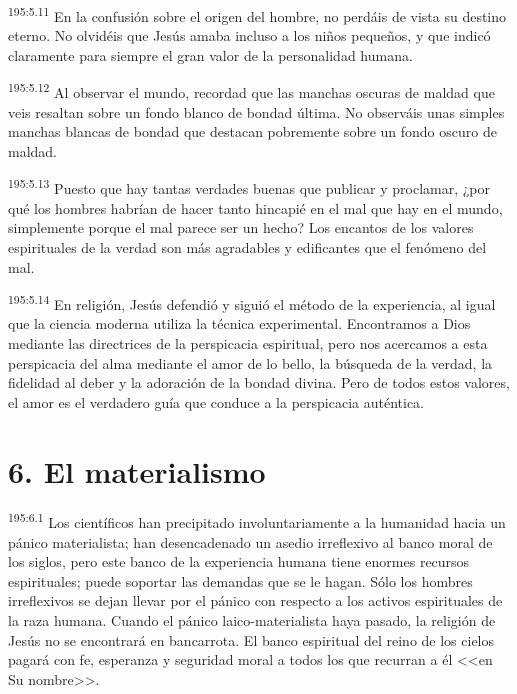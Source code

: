 \par 
\textsuperscript{195:5.11} En la confusión sobre el origen del hombre, no perdáis de vista su destino eterno. No olvidéis que Jesús amaba incluso a los niños pequeños, y que indicó claramente para siempre el gran valor de la personalidad humana.

\par 
\textsuperscript{195:5.12} Al observar el mundo, recordad que las manchas oscuras de maldad que veis resaltan sobre un fondo blanco de bondad última. No observáis unas simples manchas blancas de bondad que destacan pobremente sobre un fondo oscuro de maldad.

\par 
\textsuperscript{195:5.13} Puesto que hay tantas verdades buenas que publicar y proclamar, ¿por qué los hombres habrían de hacer tanto hincapié en el mal que hay en el mundo, simplemente porque el mal parece ser un hecho? Los encantos de los valores espirituales de la verdad son más agradables y edificantes que el fenómeno del mal.

\par 
\textsuperscript{195:5.14} En religión, Jesús defendió y siguió el método de la experiencia, al igual que la ciencia moderna utiliza la técnica experimental. Encontramos a Dios mediante las directrices de la perspicacia espiritual, pero nos acercamos a esta perspicacia del alma mediante el amor de lo bello, la búsqueda de la verdad, la fidelidad al deber y la adoración de la bondad divina. Pero de todos estos valores, el amor es el verdadero guía que conduce a la perspicacia auténtica.

\section*{6. El materialismo}
\par 
\textsuperscript{195:6.1} Los científicos han precipitado involuntariamente a la humanidad hacia un pánico materialista; han desencadenado un asedio irreflexivo al banco moral de los siglos, pero este banco de la experiencia humana tiene enormes recursos espirituales; puede soportar las demandas que se le hagan. Sólo los hombres irreflexivos se dejan llevar por el pánico con respecto a los activos espirituales de la raza humana. Cuando el pánico laico-materialista haya pasado, la religión de Jesús no se encontrará en bancarrota. El banco espiritual del reino de los cielos pagará con fe, esperanza y seguridad moral a todos los que recurran a él <<en Su nombre>>.

